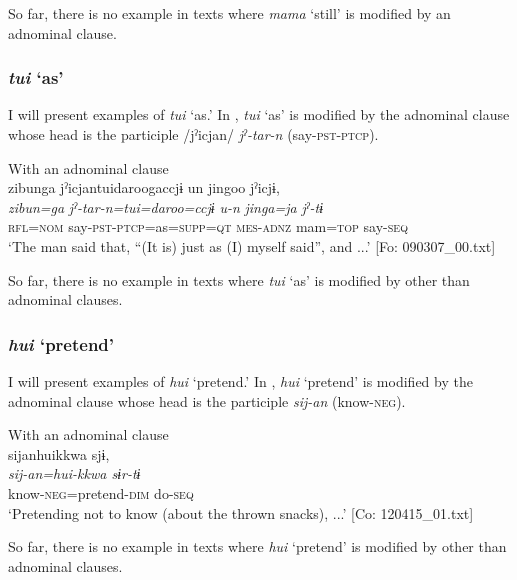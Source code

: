 So far, there is no example in texts where \textit{mama} ‘still’ is modified by an adnominal clause.

\subsubsection{ \textit{tui} ‘as’}

I will present examples of \textit{tui} ‘as.’ In , \textit{tui} ‘as’ is modified by the adnominal clause whose head is the participle /jˀicjan/ \textit{jˀ-tar-n} (say-\textsc{pst}-\textsc{ptcp}).

\ea\label{ex:6-28}
 With an adnominal clause\\

{\TM}
\glll {\textbar}zibunga{\textbar}  jˀicjantuidaroogaccjɨ  un  jingoo  jˀicjɨ,\\
\textit{zibun=ga}  \textit{jˀ-tar-n=tui=daroo=ccjɨ}  \textit{u-n}  \textit{jinga=ja}  \textit{jˀ-tɨ}\\
    \textsc{rfl}=\textsc{nom}  say-\textsc{pst}-\textsc{ptcp}=as=\textsc{supp}=\textsc{qt}  \textsc{mes}-\textsc{adnz}  mam=\textsc{top}  say-\textsc{seq}\\
\glt    ‘The man said that, “(It is) just as (I) myself said”, and ...’ [Fo: 090307\_00.txt]
\z

So far, there is no example in texts where \textit{tui} ‘as’ is modified by other than adnominal clauses.

\subsubsection{ \textit{hui} ‘pretend’}

I will present examples of \textit{hui} ‘pretend.’ In , \textit{hui} ‘pretend’ is modified by the adnominal clause whose head is the participle \textit{sij-an} (know-\textsc{neg}).

\ea\label{ex:6-29}
 With an adnominal clause\\

{\TM}
\glll sijanhuikkwa  sjɨ,\\
\textit{sij-an=hui-kkwa  sɨr-tɨ}\\
    know-\textsc{neg}=pretend-\textsc{dim}  do-\textsc{seq}\\
\glt    ‘Pretending not to know (about the thrown snacks), ...’ [Co: 120415\_01.txt]
\z

So far, there is no example in texts where \textit{hui} ‘pretend’ is modified by other than adnominal clauses.

